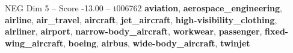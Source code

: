 \begin{textsample}{NEG Dim 5 – Score -13.00 – t006762}  \label{ex:f5_neg_028}
\textbf{aviation}, \textbf{aerospace\_engineering}, \textbf{airline}, \textbf{air\_travel}, \textbf{aircraft}, \textbf{jet\_aircraft}, \textbf{high-visibility\_clothing}, \textbf{airliner}, \textbf{airport}, \textbf{narrow-body\_aircraft}, \textbf{workwear}, \textbf{passenger}, \textbf{fixed-wing\_aircraft}, \textbf{boeing}, \textbf{airbus}, \textbf{wide-body\_aircraft}, \textbf{twinjet}

\end{textsample}
